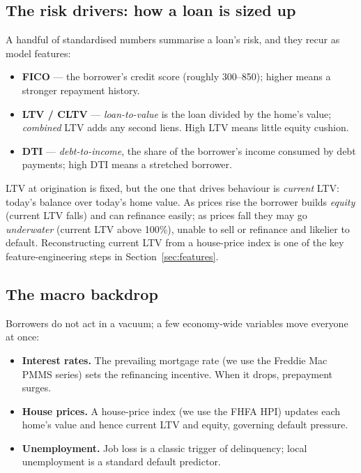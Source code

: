 \documentclass[11pt]{article}
\begin{document}
\subsection{The risk drivers: how a loan is sized up}

A handful of standardised numbers summarise a loan's risk, and they recur as model features:

\begin{itemize}[leftmargin=1.4em, itemsep=2pt]
  \item \textbf{FICO} --- the borrower's credit score (roughly 300--850); higher means a
        stronger repayment history.
  \item \textbf{LTV / CLTV} --- \emph{loan-to-value} is the loan divided by the home's value;
        \emph{combined} LTV adds any second liens. High LTV means little equity cushion.
  \item \textbf{DTI} --- \emph{debt-to-income}, the share of the borrower's income consumed by
        debt payments; high DTI means a stretched borrower.
\end{itemize}

\begin{jargon}
LTV at origination is fixed, but the one that drives behaviour is \emph{current} LTV: today's
balance over today's home value. As prices rise the borrower builds \emph{equity} (current LTV
falls) and can refinance easily; as prices fall they may go \emph{underwater} (current LTV above
100\%), unable to sell or refinance and likelier to default. Reconstructing current LTV from a
house-price index is one of the key feature-engineering steps in Section~\ref{sec:features}.
\end{jargon}

\subsection{The macro backdrop}

Borrowers do not act in a vacuum; a few economy-wide variables move everyone at once:

\begin{itemize}[leftmargin=1.4em, itemsep=2pt]
  \item \textbf{Interest rates.} The prevailing mortgage rate (we use the Freddie Mac PMMS
        series) sets the refinancing incentive. When it drops, prepayment surges.
  \item \textbf{House prices.} A house-price index (we use the FHFA HPI) updates each home's
        value and hence current LTV and equity, governing default pressure.
  \item \textbf{Unemployment.} Job loss is a classic trigger of delinquency; local
        unemployment is a standard default predictor.
\end{itemize}
\end{document}
